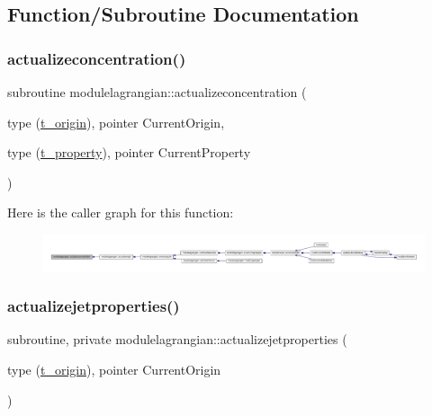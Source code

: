 \subsection{Function/\+Subroutine Documentation}
\mbox{\label{namespacemodulelagrangian_a597916eb747603cbeb884fab22473311}} 
\subsubsection{\texorpdfstring{actualizeconcentration()}{actualizeconcentration()}}
{\footnotesize\ttfamily subroutine modulelagrangian\+::actualizeconcentration (\begin{DoxyParamCaption}\item[{type (\mbox{\hyperlink{structmodulelagrangian_1_1t__origin}{t\+\_\+origin}}), pointer}]{Current\+Origin,  }\item[{type (\mbox{\hyperlink{structmodulelagrangian_1_1t__property}{t\+\_\+property}}), pointer}]{Current\+Property }\end{DoxyParamCaption})\hspace{0.3cm}{\ttfamily [private]}}

Here is the caller graph for this function\+:\nopagebreak
\begin{figure}[H]
\begin{center}
\leavevmode
\includegraphics[width=350pt]{namespacemodulelagrangian_a597916eb747603cbeb884fab22473311_icgraph}
\end{center}
\end{figure}
\mbox{\label{namespacemodulelagrangian_a10887a715db0d544ed022e6dc66acdb2}} 
\subsubsection{\texorpdfstring{actualizejetproperties()}{actualizejetproperties()}}
{\footnotesize\ttfamily subroutine, private modulelagrangian\+::actualizejetproperties (\begin{DoxyParamCaption}\item[{type (\mbox{\hyperlink{structmodulelagrangian_1_1t__origin}{t\+\_\+origin}}), pointer}]{Current\+Origin }\end{DoxyParamCaption})\hspace{0.3cm}{\ttfamily [private]}}

